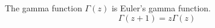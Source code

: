 \documentclass{article}
\begin{document}
The gamma function $\Gamma(z)$ is Euler's gamma function.
\begin{equation}
  \Gamma(z+1)=z\Gamma(z)
\end{equation}
\end{document}
